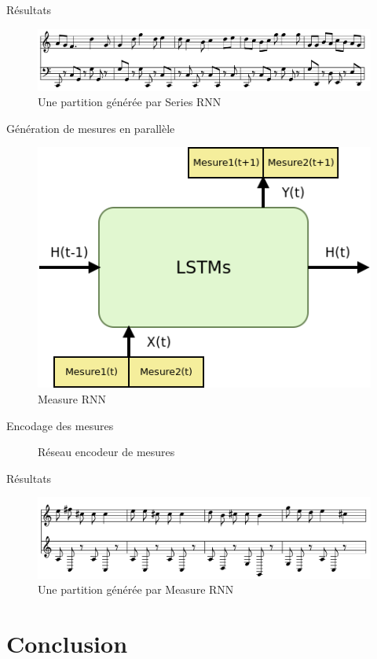 \documentclass{beamer}
\begin{document}
\begin{frame}{Résultats}
\begin{figure}
\begin{center}
\includegraphics[scale=0.3]{images/series_rnn_result.png}
\caption{Une partition générée par Series RNN}
\end{center}
\end{figure}
\end{frame}

\begin{frame}{Génération de mesures en parallèle}
\begin{figure}
\begin{center}
\includegraphics[scale=0.5]{images/measure_rnn.png}
\caption{Measure RNN}
\end{center}
\end{figure}
\end{frame}

\begin{frame}{Encodage des mesures}
\begin{figure}
\begin{center}

\caption{Réseau encodeur de mesures}
\end{center}
\end{figure}
\end{frame}

\begin{frame}{Résultats}
\begin{figure}
\begin{center}
\includegraphics[scale=0.3]{images/measure_rnn_result.png}
\caption{Une partition générée par Measure RNN}
\end{center}
\end{figure}
\end{frame}

\section{Conclusion}
\end{document}
